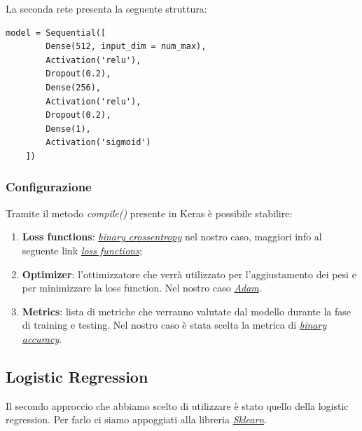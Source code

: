 La seconda rete presenta la seguente struttura:
\begin{lstlisting}[backgroundcolor = \color{white}]
		model = Sequential([
        Dense(512, input_dim = num_max),
        Activation('relu'),
        Dropout(0.2),
        Dense(256),
        Activation('relu'),
        Dropout(0.2),
        Dense(1),
        Activation('sigmoid')
    ])
\end{lstlisting}


\subsubsection{Configurazione}
Tramite il metodo \textit{compile()} presente in Keras è possibile stabilire:
\begin{enumerate}
	\item \textbf{Loss functions}: \href{https://en.wikipedia.org/wiki/Cross_entropy}{\textit{binary crossentropy}} nel nostro caso, maggiori info al seguente link \href{https://keras.io/losses/}{\textit{loss functions}};
	\item \textbf{Optimizer}: l'ottimizzatore che verrà utilizzato per l'aggiustamento dei pesi e per minimizzare la loss function.
	Nel nostro caso \href{https://arxiv.org/pdf/1412.6980v8.pdf}{\textit{Adam}}. 
	\item \textbf{Metrics}: lista di metriche che verranno valutate dal modello durante la fase di training e testing.
	Nel nostro caso è stata scelta la metrica di \href{https://keras.io/metrics/#binary_accuracy}{\textit{binary accuracy}}.  
\end{enumerate} 
\subsection{Logistic Regression}
Il secondo approccio che abbiamo scelto di utilizzare è stato quello della logistic regression.
Per farlo ci siamo appoggiati alla libreria \href{https://scikit-learn.org/stable/}{\textit{Sklearn}}.
